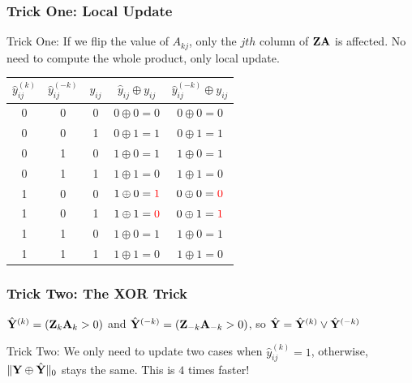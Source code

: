 \documentclass{beamer}
\newcommand{\A}{{\bf A}}
\newcommand{\Y}{{\bf Y}}
\newcommand{\Z}{{\bf Z}}
\begin{document}
\begin{frame}
\frametitle{Trick One: Local Update}
Trick One: If we flip the value of $A_{kj}$, only the $jth$ column of $\Z\A$ is affected. No need to compute the whole product, only local update.

\end{frame}

\begin{frame}
\begin{center}
  \begin{tabular}{ c | c | c || c | c}
    \hline
    $\hat y^{(k)}_{ij}$ & $\hat y^{(-k)}_{ij}$ & $y_{ij}$ & $\hat y_{ij} \oplus y_{ij}$ & $\hat y^{(-k)}_{ij} \oplus y_{ij}$ \\ \hline
    0 & 0 & 0 & $0 \oplus 0 = 0$ & $0 \oplus 0 = 0$ \\ \hline
    0 & 0 & 1 & $0 \oplus 1 = 1$ & $0 \oplus 1 = 1$ \\ \hline
    0 & 1 & 0 & $1 \oplus 0 = 1$ & $1 \oplus 0 = 1$ \\ \hline
    0 & 1 & 1 & $1 \oplus 1 = 0$ & $1 \oplus 1 = 0$ \\ \hline
    1 & 0 & 0 & $1 \oplus 0 = \color{red}{1}$ & $0 \oplus 0 = \color{red}{0}$ \\ \hline
    1 & 0 & 1 & $1 \oplus 1 = \color{red}{0}$ & $0 \oplus 1 = \color{red}{1}$ \\ \hline
    1 & 1 & 0 & $1 \oplus 0 = 1$ & $1 \oplus 0 = 1$ \\ \hline
    1 & 1 & 1 & $1 \oplus 1 = 0$ & $1 \oplus 1 = 0$ \\ \hline
  \end{tabular}
\end{center}

\fontsize{8pt}{7.2}\selectfont
\frametitle{Trick Two: The XOR Trick}
$\hat\Y^{(k)} = (\Z_k \A_k > 0)$ and $\hat\Y^{(-k)} = (\Z_{-k} \A_{-k} > 0)$, so $\hat\Y = \hat\Y^{(k)} \vee \hat\Y^{(-k)}$

Trick Two: We only need to update two cases when $\hat y^{(k)}_{ij} = 1$, otherwise, $\|\Y \oplus \hat\Y\|_0$ stays the same. This is $4$ times faster!

\end{frame}
\end{document}
